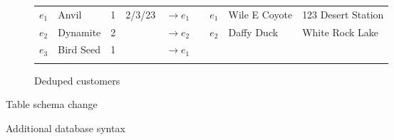 \documentclass[english,submission]{programming}
\theoremstyle{definition}
\begin{document}
\begin{figure}
\begin{subfigure}[b]{40em}
\begin{tabular}{ r|l|r|r|r|cr|l|l|}
     $e_1$ & Anvil & 1 & 2/3/23 & $\rightarrow\!e_1$ && $e_1$ & Wile E Coyote & 123 Desert Station \\
     \hhline{~----~~--}
     $e_2$ & Dynamite & 2 & & $\rightarrow\!e_2$ && $e_2$ & Daffy Duck & White Rock Lake \\
     \hhline{~----~~--}
     $e_3$ & Bird Seed & 1 & & $\rightarrow\!e_1$ && \multicolumn{3}{l}{}$e_3$\\
     \hhline{~----~~~~}
  \end{tabular}
  \caption{Deduped customers}
  \label{fig:tables-dedup}
\end{subfigure}
\caption{Table schema change}
\label{fig:tables}
\end{figure}
\begin{figure}
  \caption{Additional database syntax}
  \label{fig:db-syntax}
\end{figure}
\end{document}
